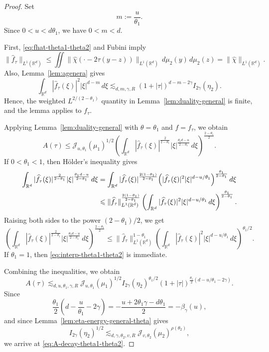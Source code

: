 \documentclass[11pt]{amsart}
\numberwithin{equation}{section}
\renewcommand{\le}{\leqslant}
\newcommand{\J}{\mathcal{J}}
\theoremstyle{plain}
\theoremstyle{remark}
\newcommand{\Rd}{\mathbb{R}^d}
\begin{document}
\begin{proof}
Set
\[
m:=\frac{u}{\theta_1}.
\]
Since $0<u<d\theta_1$, we have $0<m<d$.

First, \eqref{eq:fhat-theta1-theta2} and Fubini imply
\[
\|\widehat f_{\tau}\|_{L^1(\Rd)}
\le
\iint \|\widehat\chi(\cdot-2\tau(y-z))\|_{L^1(\Rd)}\,d\mu_2(y)\,d\mu_2(z)
=
\|\widehat\chi\|_{L^1(\Rd)}.
\]
Also, Lemma~\ref{lem:agenera} gives
\[
\int_{\Rd}|\widehat f_{\tau}(\xi)|^2|\xi|^{d-m}\,d\xi
\lesssim_{d,m,\gamma,R}
(1+|\tau|)^{d-m-2\gamma}I_{2\gamma}(\eta_2).
\]
Hence, the weighted $L^{2/(2-\theta_1)}$ quantity in
Lemma~\ref{lem:duality-general} is finite, and the lemma applies to $f_\tau$.

Applying Lemma~\ref{lem:duality-general} with $\theta=\theta_1$ and $f=f_\tau$,
we obtain
\[
A(\tau)
\le
\J_{u,\theta_1}(\mu_1)^{1/2}
\left(\int_{\Rd}|\widehat f_{\tau}(\xi)|^{\frac{2}{2-\theta_1}}
|\xi|^{\frac{\theta_1 d-u}{2-\theta_1}}\,d\xi\right)^{\frac{2-\theta_1}{2}}.
\]
If $0<\theta_1<1$, then H\"older's inequality gives
\begin{align*}
\int_{\Rd}|\widehat f_{\tau}(\xi)|^{\frac{2}{2-\theta_1}}
|\xi|^{\frac{\theta_1 d-u}{2-\theta_1}}\,d\xi
& =
\int_{\Rd}
|\widehat f_{\tau}(\xi)|^{\frac{2(1-\theta_1)}{2-\theta_1}}
\Bigl(|\widehat f_{\tau}(\xi)|^2|\xi|^{d-u/\theta_1}\Bigr)^{\frac{\theta_1}{2-\theta_1}}
\,d\xi\\
&\le
\|\widehat f_{\tau}\|_{L^1(\Rd)}^{\frac{2(1-\theta_1)}{2-\theta_1}}
\left(
\int_{\Rd}|\widehat f_{\tau}(\xi)|^2|\xi|^{d-u/\theta_1}\,d\xi
\right)^{\frac{\theta_1}{2-\theta_1}}.
\end{align*}
Raising both sides to the power $(2-\theta_1)/2$, we get
\begin{equation}\label{eq:interp-theta1-theta2}
\left(\int_{\Rd}|\widehat f_{\tau}(\xi)|^{\frac{2}{2-\theta_1}}
|\xi|^{\frac{\theta_1 d-u}{2-\theta_1}}\,d\xi\right)^{\frac{2-\theta_1}{2}}
\le
\|\widehat f_{\tau}\|_{L^1(\Rd)}^{1-\theta_1}
\left(
\int_{\Rd}|\widehat f_{\tau}(\xi)|^2|\xi|^{d-u/\theta_1}\,d\xi
\right)^{\theta_1/2}.
\end{equation}
If $\theta_1=1$, then \eqref{eq:interp-theta1-theta2} is immediate.

Combining the inequalities, we obtain
\[
A(\tau)
\lesssim_{d,u,\theta_1,\gamma,R}
\J_{u,\theta_1}(\mu_1)^{1/2}
I_{2\gamma}(\eta_2)^{\theta_1/2}
(1+|\tau|)^{\frac{\theta_1}{2}(d-u/\theta_1-2\gamma)}.
\]
Since
\[
\frac{\theta_1}{2}\left(d-\frac{u}{\theta_1}-2\gamma\right)
=
-\frac{u+2\theta_1\gamma-d\theta_1}{2}
=
-\beta_\gamma(u),
\]
and since Lemma~\ref{lem:eta-energy-general-theta} gives
\[
I_{2\gamma}(\eta_2)^{1/2}
\lesssim_{d,\gamma,\theta_2,v,R}
\J_{v,\theta_2}(\mu_2)^{\rho(\theta_2)},
\]
we arrive at \eqref{eq:A-decay-theta1-theta2}.
\end{proof}
\end{document}
